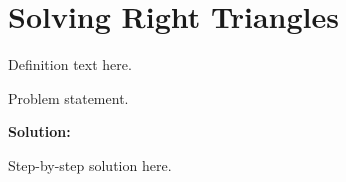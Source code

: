 \section{Solving Right Triangles}


\begin{definition}[Term]
Definition text here.
\end{definition}

\begin{example}
Problem statement.

\textbf{Solution:}

Step-by-step solution here.
\end{example}
